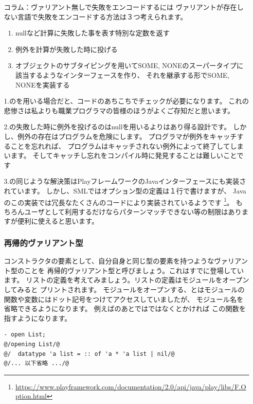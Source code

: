 \documentclass[11pt,a4paper]{jarticle}
\begin{document}
\begin{itembox}[l]{コラム：ヴァリアント無しで失敗をエンコードするには}
ヴァリアントが存在しない言語で失敗をエンコードする方法は３つ考えられます。
\begin{enumerate}
\item nullなど計算に失敗した事を表す特別な定数を返す
\item 例外を計算が失敗した時に投げる
\item オブジェクトのサブタイピングを用いてSOME, NONEのスーパータイプに該当するようなインターフェースを作り、
  それを継承する形でSOME, NONEを実装する
\end{enumerate}

1.のを用いる場合だと、コードのあちこちでチェックが必要になります。
これの悲惨さは私よりも職業プログラマの皆様のほうがよくご存知だと思います。

2.の失敗した時に例外を投げるのはnullを用いるよりはあり得る設計です。
しかし、例外の存在はプログラムを危険にします。
プログラマが例外をキャッチすることを忘れれば、
プログラムはキャッチされない例外によって終了してしまいます。
そしてキャッチし忘れをコンパイル時に発見することは難しいことです

3.の同じような解決策はPlayフレームワークのJavaインターフェースにも実装されています。
しかし、SMLではオプション型の定義は１行で書けますが、
Javaのこの実装では冗長なたくさんのコードにより実装されているようです
\footnote{\url{https://www.playframework.com/documentation/2.0/api/java/play/libs/F.Option.html}}。
もちろんユーザとして利用するだけならパターンマッチできない等の制限はありますが便利に使えると思います。
\end{itembox}

\subsubsection{再帰的ヴァリアント型}

コンストラクタの要素として、自分自身と同じ型の要素を持つようなヴァリアント型のことを
再帰的ヴァリアント型と呼びましょう。これはすでに登場しています。
リストの定義を考えてみましょう。リストの定義はモジュールをオープンしてみると
プリントされます。
モジュールをオープンする、とはモジュールの関数や変数にはドット記号をつけてアクセスしていましたが、
モジュール名を省略できるようになります。
例えばのあとではではなくとかければ
この関数を指すようになります。

\begin{lstlisting}[caption=リストの定義を確認する,label=code:open-list]
- open List;
@/opening List/@
@/  datatype 'a list = :: of 'a * 'a list | nil/@
@/... 以下省略 .../@
\end{lstlisting}
\end{document}
